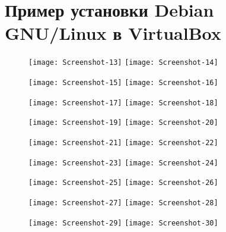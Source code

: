 \section{Пример установки Debian GNU/Linux в VirtualBox} \label{pril:b}

\begin{figure}[ht]
    \centering
	\texttt{[image: Screenshot-13]}
	\texttt{[image: Screenshot-14]}
\end{figure}

\begin{figure}[ht]
    \centering
	\texttt{[image: Screenshot-15]}
	\texttt{[image: Screenshot-16]}
\end{figure}

\begin{figure}[ht]
    \centering
	\texttt{[image: Screenshot-17]}
	\texttt{[image: Screenshot-18]}
\end{figure}

\begin{figure}[ht]
    \centering
	\texttt{[image: Screenshot-19]}
	\texttt{[image: Screenshot-20]}
\end{figure}

\begin{figure}[ht]
    \centering
	\texttt{[image: Screenshot-21]}
	\texttt{[image: Screenshot-22]}
\end{figure}

\begin{figure}[ht]
    \centering
	\texttt{[image: Screenshot-23]}
	\texttt{[image: Screenshot-24]}
\end{figure}

\begin{figure}[ht]
    \centering
	\texttt{[image: Screenshot-25]}
	\texttt{[image: Screenshot-26]}
\end{figure}


\begin{figure}[ht]
    \centering
	\texttt{[image: Screenshot-27]}
	\texttt{[image: Screenshot-28]}
\end{figure}

\begin{figure}[ht]
    \centering
	\texttt{[image: Screenshot-29]}
	\texttt{[image: Screenshot-30]}
\end{figure}

